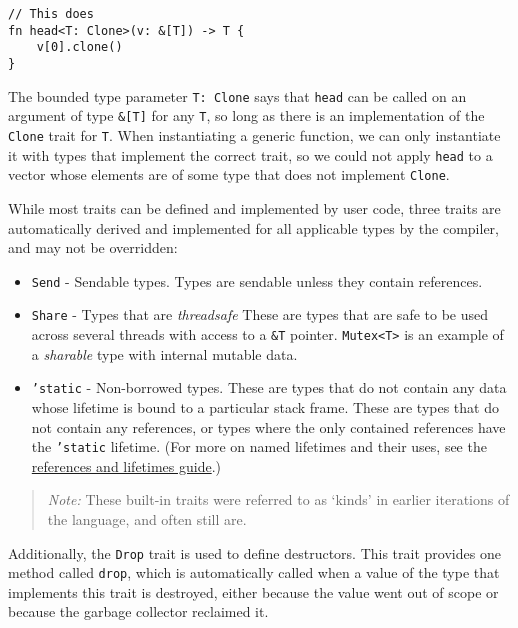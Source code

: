 \documentclass[]{article}
\begin{document}
\begin{verbatim}
// This does
fn head<T: Clone>(v: &[T]) -> T {
    v[0].clone()
}
\end{verbatim}

The bounded type parameter \texttt{T: Clone} says that \texttt{head} can
be called on an argument of type \texttt{\&{[}T{]}} for any \texttt{T},
so long as there is an implementation of the \texttt{Clone} trait for
\texttt{T}. When instantiating a generic function, we can only
instantiate it with types that implement the correct trait, so we could
not apply \texttt{head} to a vector whose elements are of some type that
does not implement \texttt{Clone}.

While most traits can be defined and implemented by user code, three
traits are automatically derived and implemented for all applicable
types by the compiler, and may not be overridden:

\begin{itemize}
\item
  \texttt{Send} - Sendable types. Types are sendable unless they contain
  references.
\item
  \texttt{Share} - Types that are \emph{threadsafe} These are types that
  are safe to be used across several threads with access to a
  \texttt{\&T} pointer. \texttt{Mutex\textless{}T\textgreater{}} is an
  example of a \emph{sharable} type with internal mutable data.
\item
  \texttt{'static} - Non-borrowed types. These are types that do not
  contain any data whose lifetime is bound to a particular stack frame.
  These are types that do not contain any references, or types where the
  only contained references have the \texttt{'static} lifetime. (For
  more on named lifetimes and their uses, see the
  \href{guide-lifetimes.html}{references and lifetimes guide}.)
\end{itemize}

\begin{quote}
\emph{Note:} These built-in traits were referred to as `kinds' in
earlier iterations of the language, and often still are.
\end{quote}

Additionally, the \texttt{Drop} trait is used to define destructors.
This trait provides one method called \texttt{drop}, which is
automatically called when a value of the type that implements this trait
is destroyed, either because the value went out of scope or because the
garbage collector reclaimed it.
\end{document}
